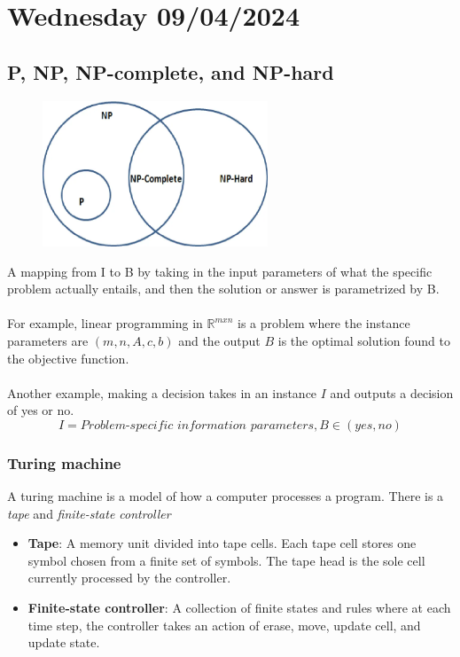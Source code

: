 \section{Wednesday 09/04/2024}
\subsection{P, NP, NP-complete, and NP-hard}
\begin{figure}[htbp]
  \centerline{\includegraphics[width=0.6\textwidth]{images/p_venn_diagram.png}}
\end{figure}


A mapping from I to B by taking in the input parameters of what the specific problem actually entails, and then the solution or answer is parametrized by B.
\\ \\
For example, linear programming in $\mathbb{R}^{mxn}$ is a problem where the instance parameters are $(m,n,A,c,b)$ and the output $B$ is the optimal solution found to the objective function.
\\ \\ 
Another example, making a decision takes in an instance $I$ and outputs a decision of yes or no.
\begin{equation}
  I = \textit{Problem-specific information parameters}, B \in (yes, no)
\end{equation}

\subsubsection{Turing machine}
A turing machine is a model of how a computer processes a program. There is a \textit{tape} and \textit{finite-state controller}  
\begin{itemize}
  \item \textbf{Tape}: A memory unit divided into tape cells. Each tape cell stores one symbol chosen from a finite set of symbols. The tape head is the sole cell currently processed by the controller. 
  \item \textbf{Finite-state controller}: A collection of finite states and rules where at each time step, the controller takes an action of erase, move, update cell, and update state.
\end{itemize}

